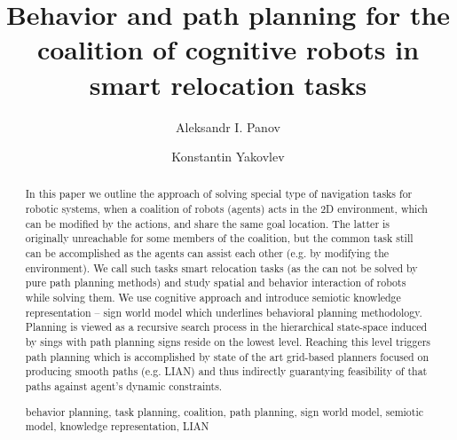 \documentclass[runningheads,a4paper]{llncs}
\newcommand{\keywords}[1]{\par\addvspace\baselineskip
\noindent\keywordname\enspace\ignorespaces#1}
\begin{document}
\mainmatter  %

\title{Behavior and path planning for the coalition of cognitive robots in smart relocation tasks}


\author{Aleksandr I. Panov \and Konstantin Yakovlev}
%


\maketitle


\begin{abstract}
In this paper we outline the approach of solving special type of navigation tasks for robotic systems, when a coalition of robots (agents) acts in the 2D environment, which can be modified by the actions, and share the same goal location. The latter is originally unreachable for some members of the coalition, but the common task still can be accomplished as the agents can assist each other (e.g. by modifying the environment). We call such tasks smart relocation tasks (as the can not be solved by pure path planning methods) and study spatial and behavior interaction of robots while solving them. We use cognitive approach and introduce semiotic knowledge representation – sign world model which underlines behavioral planning methodology. Planning is viewed as a recursive search process in the hierarchical state-space induced by sings with path planning signs reside on the lowest level. Reaching this level triggers path planning which is accomplished by state of the art grid-based planners focused on producing smooth paths (e.g. LIAN) and thus indirectly guarantying feasibility of that paths against agent's dynamic constraints.
\keywords{behavior planning, task planning, coalition, path planning, sign world model, semiotic model, knowledge representation, LIAN}
\end{abstract}
\end{document}

